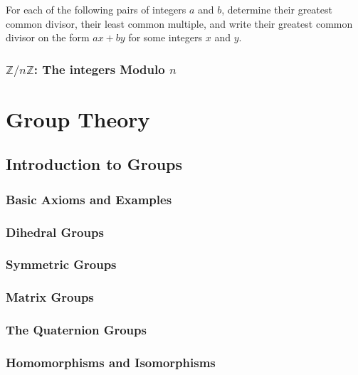\documentclass[cn,11pt,chinese]{elegantbook}
\numberwithin{equation}{section}
\begin{document}
\begin{problemset}
\item For each of the following pairs of integers $a$ and $b$, determine their greatest common divisor, their least common multiple, and write their greatest common divisor on the form $ax + by$ for some integers $x$ and $y$.
\end{problemset}


\section{$\mathbb{Z}/n\mathbb{Z}$: The integers Modulo $n$}\label{section00003}


\part{Group Theory}
\chapter{Introduction to Groups}\label{chapter001}
\section{Basic Axioms and Examples}\label{section00101}


\section{Dihedral Groups}\label{section00102}



\section{Symmetric Groups}\label{section00103}



\section{Matrix Groups}\label{section00104}



\section{The Quaternion Groups}\label{section00105}



\section{Homomorphisms and Isomorphisms}\label{section00106}
\end{document}
